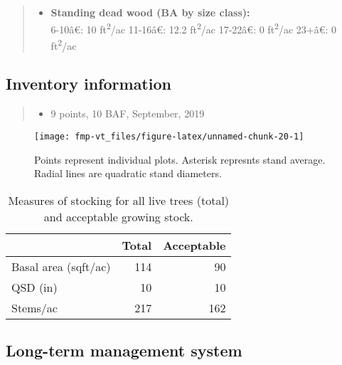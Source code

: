 \documentclass[]{tufte-handout}
\newcommand{\euro}{€}
\providecommand{\tightlist}{%
  \setlength{\itemsep}{0pt}\setlength{\parskip}{0pt}}
\begin{document}
\begin{quote}
\begin{itemize}
\tightlist
\item
  \textbf{Standing dead wood (BA by size class):}\\
  \vspace{2pt} 6-10â\euro{}: 10 ft\textsuperscript{2}/ac \textbar{}
  11-16â\euro{}: 12.2 ft\textsuperscript{2}/ac \textbar{}
  17-22â\euro{}: 0 ft\textsuperscript{2}/ac \textbar{} 23+â\euro{}: 0
  ft\textsuperscript{2}/ac
\end{itemize}
\end{quote}

\subsection{Inventory information}\label{inventory-information-4}

\begin{quote}
\begin{itemize}
\tightlist
\item
  9 points, 10 BAF, September, 2019
\end{itemize}
\end{quote}

\begin{figure}
\texttt{[image: fmp-vt\_files/figure-latex/unnamed-chunk-20-1]} \caption[Points represent individual plots]{Points represent individual plots. Asterisk represnts stand average. Radial lines are quadratic stand diameters.}\label{fig:unnamed-chunk-20}
\end{figure}

\begin{table}

\caption{\label{tab:unnamed-chunk-21}Measures of stocking for all live trees (total) and acceptable growing stock.}
\centering
\begin{tabular}[t]{lrr}
\toprule
  & Total & Acceptable\\
\midrule
Basal area (sqft/ac) & 114 & 90\\
QSD (in) & 10 & 10\\
Stems/ac & 217 & 162\\
\bottomrule
\end{tabular}
\end{table}

\subsection{Long-term management
system}\label{long-term-management-system-4}
\end{document}
